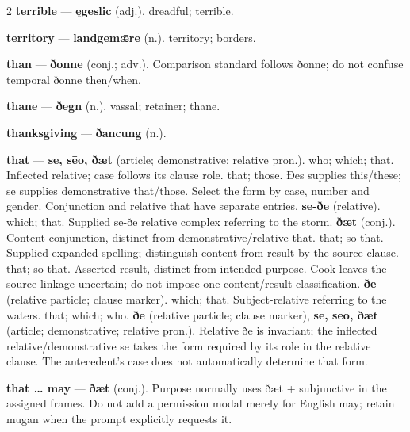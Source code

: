 \begin{multicols}{2}
\textbf{terrible} — \textbf{ęgeslic} (adj.). dreadful; terrible.\par
\textbf{territory} — \textbf{landgemǣre} (n.). territory; borders.\par
\textbf{than} — \textbf{ðonne} (conj.; adv.). Comparison standard follows ðonne; do not confuse temporal ðonne then/when.\par
\textbf{thane} — \textbf{ðegn} (n.). vassal; retainer; thane.\par
\textbf{thanksgiving} — \textbf{ðancung} (n.).\par
\textbf{that} — \textbf{se, sēo, ðæt} (article; demonstrative; relative pron.). who; which; that. Inflected relative; case follows its clause role. that; those. Ðes supplies this/these; se supplies demonstrative that/those. Select the form by case, number and gender. Conjunction and relative that have separate entries. \textbf{se-ðe} (relative). which; that. Supplied se-ðe relative complex referring to the storm. \textbf{ðæt} (conj.). Content conjunction, distinct from demonstrative/relative that. that; so that. Supplied expanded spelling; distinguish content from result by the source clause. that; so that. Asserted result, distinct from intended purpose. Cook leaves the source linkage uncertain; do not impose one content/result classification. \textbf{ðe} (relative particle; clause marker). which; that. Subject-relative referring to the waters. that; which; who. \textbf{ðe} (relative particle; clause marker), \textbf{se, sēo, ðæt} (article; demonstrative; relative pron.). Relative ðe is invariant; the inflected relative/demonstrative se takes the form required by its role in the relative clause. The antecedent’s case does not automatically determine that form.\par
\textbf{that … may} — \textbf{ðæt} (conj.). Purpose normally uses ðæt + subjunctive in the assigned frames. Do not add a permission modal merely for English may; retain mugan when the prompt explicitly requests it.\par

\end{multicols}
